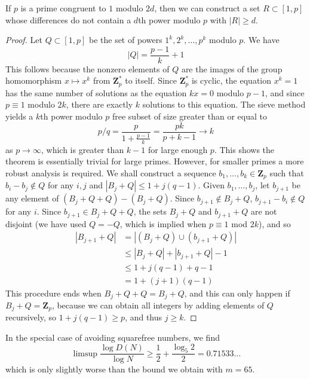 \begin{lemma}
    If $p$ is a prime congruent to $1$ modulo $2d$, then we can construct a set $R \subset [1,p]$ whose differences do not contain a $d$th power modulo $p$ with $|R| \geq d$.
\end{lemma}
\begin{proof}
    Let $Q \subset [1,p]$ be the set of powers $1^k, 2^k, \dots, p^k$ modulo $p$. We have
    \[ |Q| = \frac{p-1}{k} + 1 \]
    This follows because the nonzero elements of $Q$ are the images of the group homomorphism $x \mapsto x^k$ from $\mathbf{Z}_p^*$ to itself. Since $\mathbf{Z}_p^*$ is cyclic, the equation $x^k = 1$ has the same number of solutions as the equation $kx = 0$ modulo $p-1$, and since $p \equiv 1$ modulo $2k$, there are exactly $k$ solutions to this equation. The sieve method yields a $k$th power modulo $p$ free subset of size greater than or equal to
    \[ p/q = \frac{p}{1 + \frac{p-1}{k}} = \frac{pk}{p + k - 1} \to k \]
    as $p \to \infty$, which is greater than $k-1$ for large enough $p$. This shows the theorem is essentially trivial for large primes. However, for smaller primes a more robust analysis is required. We shall construct a sequence $b_1, \dots, b_k \in \mathbf{Z}_p$ such that $b_i - b_j \not \in Q$ for any $i,j$ and $|B_j + Q| \leq 1 + j(q-1)$. Given $b_1, \dots, b_j$, let $b_{j+1}$ be any element of $(B_j + Q + Q) - (B_j + Q)$. Since $b_{j+1} \not \in B_j + Q$, $b_{j+1} - b_i \not \in Q$ for any $i$. Since $b_{j+1} \in B_j + Q + Q$, the sets $B_j + Q$ and $b_{j+1} + Q$ are not disjoint (we have used $Q = -Q$, which is implied when $p \equiv 1$ mod $2k$), and so
    \begin{align*}
        |B_{j+1} + Q| &= |(B_j + Q) \cup (b_{j+1} + Q)|\\
        &\leq |B_j + Q| + |b_{j+1} + Q| - 1\\
        &\leq 1 + j(q-1) + q - 1\\
        &= 1 + (j+1)(q-1)
    \end{align*}
    This procedure ends when $B_j + Q + Q = B_j + Q$, and this can only happen if $B_j + Q = \mathbf{Z}_p$, because we can obtain all integers by adding elements of $Q$ recursively, so $1 + j(q-1) \geq p$, and thus $j \geq k$.
\end{proof}

\begin{corollary}
    In the special case of avoiding squarefree numbers, we find 
    \[ \limsup \frac{\log D(N)}{\log N} \geq \frac{1}{2} + \frac{\log_5 2}{2} = 0.71533\dots \]
    which is only slightly worse than the bound we obtain with $m = 65$.
\end{corollary}

